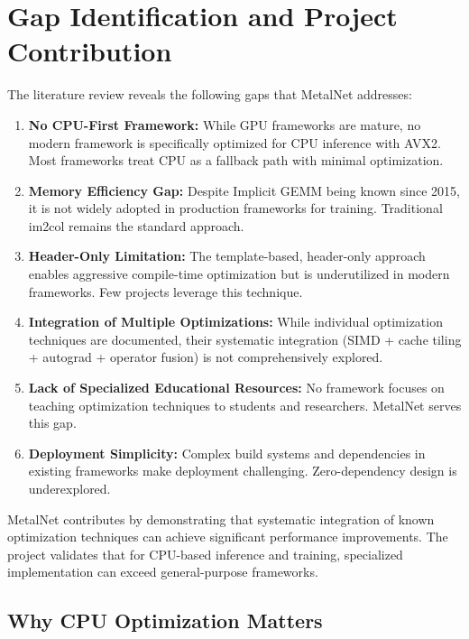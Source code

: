 \documentclass[12pt,oneside,a4paper]{report}
\begin{document}
\section{Gap Identification and Project Contribution}

The literature review reveals the following gaps that MetalNet addresses:

\begin{enumerate}
    \item \textbf{No CPU-First Framework:} While GPU frameworks are mature, no modern framework is specifically optimized for CPU inference with AVX2. Most frameworks treat CPU as a fallback path with minimal optimization.

    \item \textbf{Memory Efficiency Gap:} Despite Implicit GEMM being known since 2015, it is not widely adopted in production frameworks for training. Traditional im2col remains the standard approach.

    \item \textbf{Header-Only Limitation:} The template-based, header-only approach enables aggressive compile-time optimization but is underutilized in modern frameworks. Few projects leverage this technique.

    \item \textbf{Integration of Multiple Optimizations:} While individual optimization techniques are documented, their systematic integration (SIMD + cache tiling + autograd + operator fusion) is not comprehensively explored.

    \item \textbf{Lack of Specialized Educational Resources:} No framework focuses on teaching optimization techniques to students and researchers. MetalNet serves this gap.

    \item \textbf{Deployment Simplicity:} Complex build systems and dependencies in existing frameworks make deployment challenging. Zero-dependency design is underexplored.
\end{enumerate}

MetalNet contributes by demonstrating that systematic integration of known optimization techniques can achieve significant performance improvements. The project validates that for CPU-based inference and training, specialized implementation can exceed general-purpose frameworks.

\subsection{Why CPU Optimization Matters}
\end{document}
